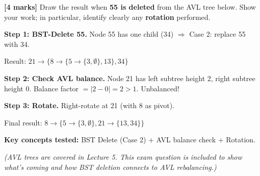 \documentclass[11pt]{article}
\begin{document}
\begin{exambox}

\textbf{[4 marks]} Draw the result when \textbf{55 is deleted} from the AVL tree below. Show your work; in particular, identify clearly any \textbf{rotation} performed.

\begin{center}
\end{center}

\begin{answerband}
\textbf{Step 1: BST-Delete 55.} Node 55 has one child (34) $\Rightarrow$ Case 2: replace 55 with 34.

Result: $21 \to \{8 \to \{5 \to \{3, \emptyset\}, 13\}, 34\}$

\textbf{Step 2: Check AVL balance.} Node 21 has left subtree height 2, right subtree height 0. Balance factor $= |2 - 0| = 2 > 1$. \textcolor{rustW}{Unbalanced!}

\textbf{Step 3: Rotate.} Right-rotate at 21 (with 8 as pivot).

Final result: $8 \to \{5 \to \{3, \emptyset\}, 21 \to \{13, 34\}\}$

\medskip
\textcolor{violetT}{\textbf{Key concepts tested:}} BST Delete (Case 2) + AVL balance check + Rotation.

\textit{(AVL trees are covered in Lecture 5. This exam question is included to show what's coming and how BST deletion connects to AVL rebalancing.)}
\end{answerband}
\end{exambox}
\end{document}

